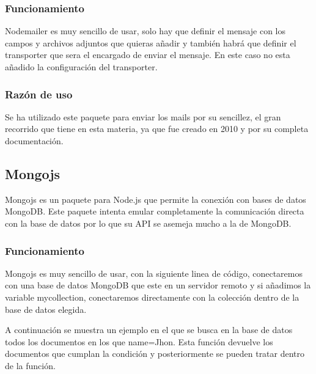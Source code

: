 \subsubsection{Funcionamiento}
Nodemailer es muy sencillo de usar, solo hay que definir el mensaje con los campos y archivos adjuntos que quieras añadir y también habrá que definir el transporter que sera el encargado de enviar el mensaje. En este caso no esta añadido la configuración del transporter.\\


\subsubsection{Razón de uso}
Se ha utilizado este paquete para enviar los mails por su sencillez, el gran recorrido que tiene en esta materia, ya que fue creado en 2010 y por su completa documentación.

\subsection{Mongojs}
Mongojs es un paquete para Node.js que permite la conexión con bases de datos MongoDB. Este paquete intenta emular completamente la comunicación directa con la base de datos por lo que su API se asemeja mucho a la de MongoDB.

\subsubsection{Funcionamiento}
Mongojs es muy sencillo de usar, con la siguiente linea de código, conectaremos con una base de datos MongoDB que este en un servidor remoto y si añadimos la variable mycollection, conectaremos directamente con la colección dentro de la base de datos elegida. \\


A continuación se muestra un ejemplo en el que se busca en la base de datos todos los documentos en los que name=Jhon. Esta función devuelve los documentos que cumplan la condición y posteriormente se pueden tratar dentro de la función.\\


